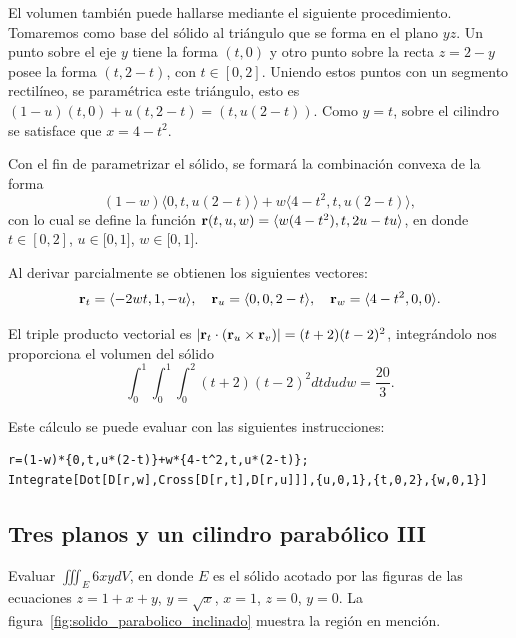 \enlargethispage*{\baselineskip}

El volumen también puede hallarse mediante el siguiente procedimiento.
Tomaremos como base del sólido al triángulo que se forma en el plano $yz$. Un punto sobre el eje $y$ tiene la forma $(t,0) $ y otro punto sobre la recta $z=2-y$ posee la forma $(t,2-t)$, con $t \in [0,2]$.
Uniendo estos puntos con un segmento rectilíneo, se paramétrica este triángulo, esto es $(1-u)(t,0) +u(t,2-t)=(t,u(2-t))$.
Como $y=t$, sobre el cilindro se satisface que $x=4-t^2$.

Con el fin de parametrizar el sólido, se formará la combinación convexa de la forma
\[(1-w) \langle 0,t,u( 2-t)\rangle +w\langle 4-t^{2},t,u( 2-t) \rangle,\]
con lo cual se define la función
${\bf r}( t,u,w) = \langle w( 4-t^{2}),t,2u-tu\rangle $,
en donde $t\in [0,2]$, $u\in \lbrack 0,1]$, $w\in \lbrack 0,1]$.

Al derivar parcialmente se obtienen los siguientes vectores:
\begin{gather*}
{\bf r}_{t} = \langle -2wt,1,-u\rangle, \quad
{\bf r}_{u} = \langle 0,0,2-t\rangle, \quad
{\bf r}_{w} = \langle 4-t^{2},0,0\rangle.
\end{gather*}

El triple producto vectorial es $|{\bf r}_{t}\cdot ({\bf r}_{u}\times {\bf r}_{v}) | = ( t+2)( t-2) ^{2}$,
integrándolo nos proporciona el volumen del sólido
\[\int_{0}^{1}\int_{0}^{1}\int_{0}^{2}(t+2)(t-2)^{2}dtdudw= \frac{20}{3}.\]

Este cálculo se puede evaluar con las siguientes instrucciones:

\begin{tcolorbox}[title=\bf Instrucción en \verb"Mathematica"]\begin{Verbatim}[formatcom=\letraverbatim]
r=(1-w)*{0,t,u*(2-t)}+w*{4-t^2,t,u*(2-t)};
Integrate[Dot[D[r,w],Cross[D[r,t],D[r,u]]],{u,0,1},{t,0,2},{w,0,1}]
\end{Verbatim}
\end{tcolorbox}

\subsection{Tres planos y un cilindro parabólico III}
Evaluar $\iiint_{E}6xydV$, en donde $E$ es el sólido acotado por las figuras de las ecuaciones $z=1+x+y$, $y=\sqrt{x}$, $x=1$, $z=0$, $y=0$. La figura~\ref{fig:solido_parabolico_inclinado} muestra la región en mención.

